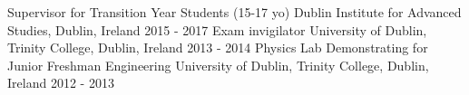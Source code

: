 \begin{cvpress}
   \cvpres
   {Supervisor for Transition Year Students (15-17 yo)}
   {Dublin Institute for Advanced Studies, Dublin, Ireland}
   {2015 - 2017}
   \cvpres
   {Exam invigilator}
   {University of Dublin, Trinity College, Dublin, Ireland}
   {2013 - 2014}
   \cvpres
   {Physics Lab Demonstrating for Junior Freshman Engineering}
   {University of Dublin, Trinity College, Dublin, Ireland}
   {2012 - 2013}
\end{cvpress}


